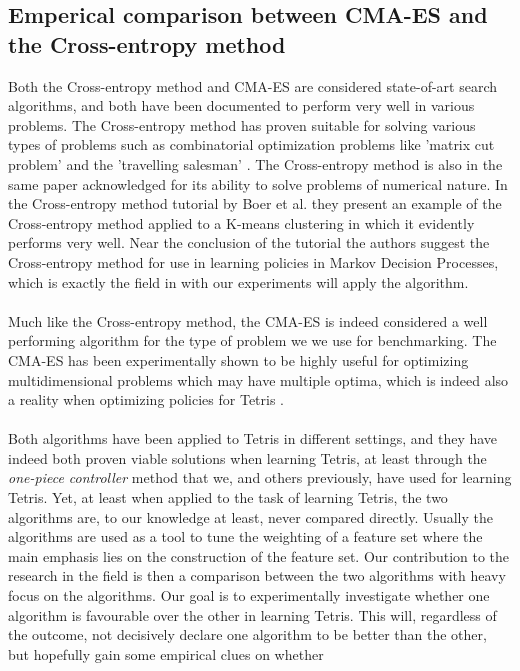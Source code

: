 \subsection{Emperical comparison between CMA-ES and the Cross-entropy method}

Both the Cross-entropy method and CMA-ES are considered state-of-art
search algorithms, and both have been documented to perform very well
in various problems. The Cross-entropy method has proven 
suitable for solving various types of problems such as 
combinatorial optimization problems like 'matrix cut problem'
and the 'travelling salesman' \citep{cetut2014}. 
The Cross-entropy method is also in the same paper acknowledged for
its ability to solve problems of numerical nature. In the 
Cross-entropy method tutorial by Boer et al. they present 
an example of the Cross-entropy method applied to 
a K-means clustering in which it evidently performs very well.
Near the conclusion of the tutorial the authors suggest the 
Cross-entropy method for use in learning policies in Markov Decision 
Processes, which is exactly the field in with our experiments will apply the
algorithm.\\
\\
Much like the Cross-entropy method, the CMA-ES is indeed considered
a well performing algorithm for the type of problem we we use for benchmarking.
The CMA-ES has been experimentally shown to be highly useful for optimizing multidimensional
problems which may have multiple optima, which is indeed also a reality when 
optimizing policies for Tetris \citep{hansen2004}.\\
\\
Both algorithms have been applied to Tetris in different settings, and they have
indeed both proven viable solutions when learning Tetris, at least through the
\textit{one-piece controller} method that we, and others previously, have used
for learning Tetris. Yet, at least when applied to the task of learning Tetris,
the two algorithms are, to our knowledge at least, never compared directly. Usually
the algorithms are used as a tool to tune the weighting of a feature set where the
main emphasis lies on the construction of the feature set. Our contribution to 
the research in the field is then a comparison between the two algorithms
with heavy focus on the algorithms. Our goal is to experimentally investigate
whether one algorithm is favourable over the other in learning Tetris.
This will, regardless of the outcome, not decisively declare one algorithm 
to be better than the other, but hopefully gain some empirical clues on whether 
